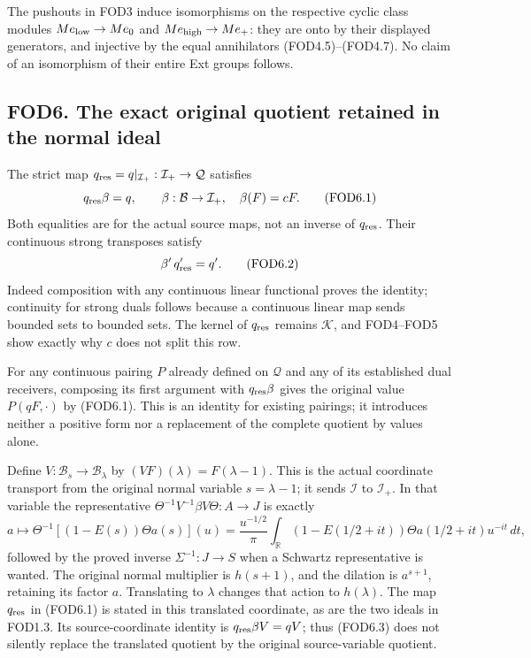 The pushouts in FOD3 induce isomorphisms on the respective cyclic class
modules \(M e_{\rm low}\to M e_0\) and \(M e_{\rm high}\to M e_+\): they
are onto by their displayed generators, and injective by the equal
annihilators (FOD4.5)--(FOD4.7). No claim of an isomorphism of their
entire Ext groups follows.

\subsection{FOD6. The exact original quotient retained in the normal
ideal}\label{fod6.-the-exact-original-quotient-retained-in-the-normal-ideal}

The strict map
\(q_{\rm res}=q|_{\mathcal I_+}:\mathcal I_+\to\mathcal Q\) satisfies \[
q_{\rm res}\beta=q,\qquad
\beta:\mathcal B\to\mathcal I_+,\quad\beta(F)=cF.
\tag{FOD6.1}
\] Both equalities are for the actual source maps, not an inverse of
\(q_{\rm res}\). Their continuous strong transposes satisfy \[
\beta'\,q_{\rm res}'=q'.
\tag{FOD6.2}
\] Indeed composition with any continuous linear functional proves the
identity; continuity for strong duals follows because a continuous
linear map sends bounded sets to bounded sets. The kernel of
\(q_{\rm res}\) remains \(\mathcal K\), and FOD4--FOD5 show exactly why
\(c\) does not split this row.

For any continuous pairing \(P\) already defined on \(\mathcal Q\) and
any of its established dual receivers, composing its first argument with
\(q_{\rm res}\beta\) gives the original value \(P(qF,\cdot)\) by
(FOD6.1). This is an identity for existing pairings; it introduces
neither a positive form nor a replacement of the complete quotient by
values alone.

Define \(V:\mathcal B_s\to\mathcal B_\lambda\) by
\((VF)(\lambda)=F(\lambda-1)\). This is the actual coordinate transport
from the original normal variable \(s=\lambda-1\); it sends
\(\mathcal I\) to \(\mathcal I_+\). In that variable the representative
\(\Theta^{-1}V^{-1}\beta V\Theta:A\to J\) is exactly \[
a\longmapsto\Theta^{-1}\!\left[(1-E(s))\Theta a(s)\right](u)
=\frac{u^{-1/2}}{\pi}\int_{\mathbb R}
(1-E(1/2+it))\Theta a(1/2+it)u^{-it}\,dt,
\tag{FOD6.3}
\] followed by the proved inverse \(\Sigma^{-1}:J\to S\) when a Schwartz
representative is wanted. The original normal multiplier is \(h(s+1)\),
and the dilation is \(a^{s+1}\), retaining its factor \(a\). Translating
to \(\lambda\) changes that action to \(h(\lambda)\). The map
\(q_{\rm res}\) in (FOD6.1) is stated in this translated coordinate, as
are the two ideals in FOD1.3. Its source-coordinate identity is
\(q_{\rm res}\beta V=qV\); thus (FOD6.3) does not silently replace the
translated quotient by the original source-variable quotient.

